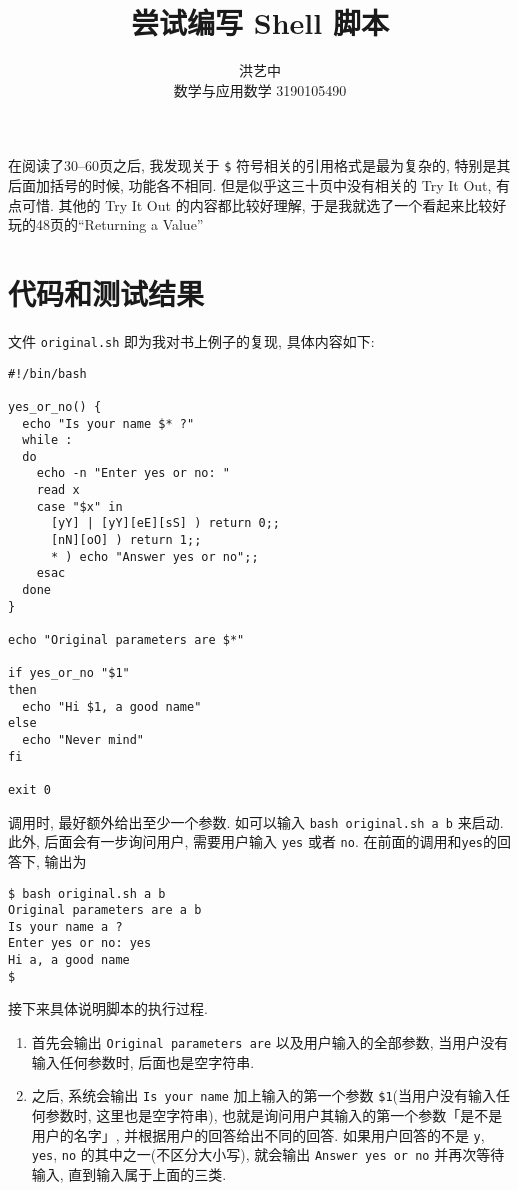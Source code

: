\documentclass{ctexart}
\title{尝试编写 Shell 脚本}
\author{洪艺中 \\ 数学与应用数学 3190105490}
\begin{document}
\maketitle
在阅读了30--60页之后, 我发现关于 \verb|$| 符号相关的引用格式是最为复杂的, 特别是其后面加括号的时候, 功能各不相同. 但是似乎这三十页中没有相关的 Try It Out, 有点可惜. 其他的 Try It Out 的内容都比较好理解, 于是我就选了一个看起来比较好玩的48页的``Returning a Value''
\section{代码和测试结果} %
\label{sec:代码和测试结果}
文件 \verb|original.sh| 即为我对书上例子的复现, 具体内容如下:
\begin{verbatim}
#!/bin/bash

yes_or_no() {
  echo "Is your name $* ?"
  while :
  do
    echo -n "Enter yes or no: "
    read x
    case "$x" in
      [yY] | [yY][eE][sS] ) return 0;;
      [nN][oO] ) return 1;;
      * ) echo "Answer yes or no";;
    esac
  done
}

echo "Original parameters are $*"

if yes_or_no "$1"
then
  echo "Hi $1, a good name"
else
  echo "Never mind"
fi

exit 0
\end{verbatim}\par
调用时, 最好额外给出至少一个参数. 如可以输入 \verb|bash original.sh a b| 来启动. 此外, 后面会有一步询问用户, 需要用户输入 \verb|yes| 或者 \verb|no|. 在前面的调用和\verb|yes|的回答下, 输出为
\begin{verbatim}
$ bash original.sh a b
Original parameters are a b
Is your name a ?
Enter yes or no: yes
Hi a, a good name
$
\end{verbatim}\par
接下来具体说明脚本的执行过程.
\begin{enumerate}
	\item 首先会输出 \verb|Original parameters are| 以及用户输入的全部参数, 当用户没有输入任何参数时, 后面也是空字符串.
	\item 之后, 系统会输出 \verb|Is your name| 加上输入的第一个参数 \verb|$1|(当用户没有输入任何参数时, 这里也是空字符串), 也就是询问用户其输入的第一个参数「是不是用户的名字」, 并根据用户的回答给出不同的回答. 如果用户回答的不是 \verb|y|, \verb|yes|, \verb|no| 的其中之一(不区分大小写), 就会输出 \verb|Answer yes or no| 并再次等待输入, 直到输入属于上面的三类.
\end{enumerate}\par
\end{document}
